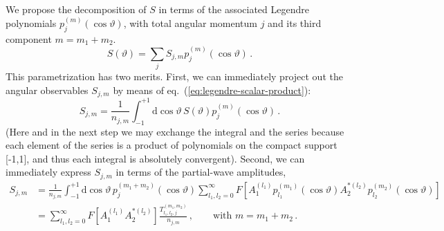 \documentclass[aps,prd,reprint,nofootinbib,preprintnumbers]{revtex4}
\newcommand{\refeq}[1]{eq.~(\ref{eq:#1})}
\newcommand{\rmdx}[1]{\mbox{d} #1 \,} %
\renewcommand{\theta}{\vartheta}
\begin{document}
We propose the decomposition of $S$ in terms of the associated Legendre polynomials $p_{j}^{(m)}(\cos\theta)$, with total angular momentum $j$ and its third component $m=m_1 + m_2$.
\begin{equation}
    S(\theta) = \sum_j S_{j,m} p_{j}^{(m)}(\cos\theta)\,.
\end{equation}
This parametrization has two merits. First, we can immediately project out the angular observables $S_{j,m}$ by means of \refeq{legendre-scalar-product}:
\begin{equation}
    S_{j,m} = \frac{1}{n_{j,m}} \int_{-1}^{+1} \rmdx{\cos\theta} S(\theta) p_{j}^{(m)}(\cos\theta)\,.
\end{equation}
(Here and in the next step we may exchange the integral and the
series because each element of the series is a product of
polynomials on the compact support [-1,1], and thus each integral
is absolutely convergent).
Second, we can immediately express $S_{j,m}$ in terms of
the partial-wave amplitudes,
\begin{equation}
    \label{eq:partial-wave-observable-infinite}
    \begin{aligned}
        S_{j,m}
            & = \frac{1}{n_{j,m}} \int_{-1}^{+1} \rmdx{\cos\theta} p_{j}^{(m_1 + m_2)}(\cos\theta) \sum_{l_1,l_2=0}^\infty F\left[A_{1}^{(l_1)} p_{l_1}^{(m_1)}(\cos\theta) A_{2}^{*(l_2)}p_{l_2}^{(m_2)}(\cos\theta)\right]\\
            & = \sum_{l_1,l_2=0}^\infty F\left[A_{1}^{(l_1)} A_{2}^{*(l_2)}\right] \frac{T_{l_1,l_2,j}^{(m_1,m_2)}}{n_{j,m}}\,,\qquad\text{with }m = m_1 + m_2\,.
    \end{aligned}
\end{equation}
\end{document}

